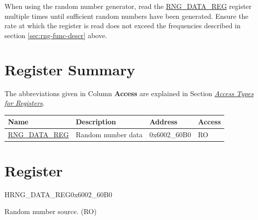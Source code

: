 \documentclass[main\_\_EN.tex]{subfiles}
\begin{document}
When using the random number generator, read the \hyperref[regdesc:RNGDATAREG]{RNG\_DATA\_REG} register multiple times until sufficient random numbers have been generated. Ensure the rate at which the register is read does not exceed the frequencies described in section \ref{sec:rng-func-descr} above.



\hypertarget{rng-reg-summ}{}
\section{Register Summary}

The abbreviations given in Column \textbf{Access} are explained in Section \hyperref[glossary-access-types]{\textit{Access Types for Registers}}.

\begin{table}[H]
    \centering
    \setlength{\extrarowheight}{0.3em}
        \begin{tabular}{ | L{3cm} | L{4cm} | C{2.5cm} | C{2cm} |  }
    \hline
    \textbf{Name} & \textbf{Description} & \textbf{Address} & \textbf{Access} \\ \hline
    \hyperref[regdesc:RNGDATAREG]{RNG\_DATA\_REG} & Random number data & 0x6002\_60B0 & RO \\ \hline
    \end{tabular}
\end{table}

\section{Register}

\begin{register}{H}{RNG\_DATA\_REG}{0x6002\_60B0}\label{regdesc:RNGDATAREG}
%
\regnewline%
\begin{regdesc}\begin{reglist}
\item [RNG\_DATA] Random number source. (RO)
\end{reglist}\end{regdesc}
\end{register}
\end{document}

